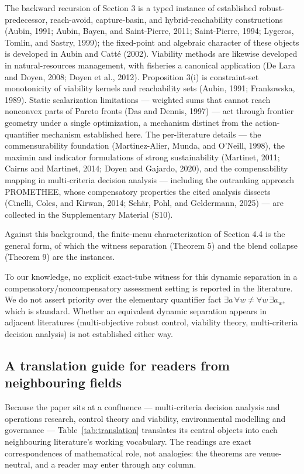 \documentclass[3p,11pt]{elsarticle}
\begin{document}
The backward recursion of Section 3 is
a typed instance of established robust-predecessor, reach-avoid,
capture-basin, and hybrid-reachability constructions (Aubin, 1991;
Aubin, Bayen, and Saint-Pierre, 2011; Saint-Pierre, 1994; Lygeros,
Tomlin, and Sastry, 1999); the fixed-point and algebraic character of these objects is developed in Aubin and Catt\'e (2002). Viability methods are likewise developed in natural-resources management, with fisheries a canonical application (De Lara and Doyen, 2008; Doyen et al., 2012). Proposition 3(i) is constraint-set
monotonicity of viability kernels and reachability sets (Aubin, 1991;
Frankowska, 1989). Static scalarization limitations --- weighted sums that cannot
reach nonconvex parts of Pareto fronts (Das and Dennis, 1997) --- act
through frontier geometry under a single optimization, a mechanism
distinct from the action-quantifier mechanism established here. The
per-literature details --- the commensurability foundation
(Martinez-Alier, Munda, and O'Neill, 1998), the maximin and indicator
formulations of strong sustainability (Martinet, 2011; Cairns and
Martinet, 2014; Doyen and Gajardo, 2020), and the compensability mapping
in multi-criteria decision analysis --- including the outranking approach
PROMETHEE, whose compensatory properties the cited analysis dissects
(Cinelli, Coles, and Kirwan, 2014; Sch\"ar, Pohl, and Geldermann, 2025) --- are collected in the
Supplementary Material (S10).

Against this background, the finite-menu characterization of
Section 4.4 is the general form, of which the witness separation
(Theorem 5) and the blend collapse (Theorem 9) are the instances.

To our knowledge, no explicit exact-tube witness for this dynamic
separation in a compensatory/noncompensatory assessment setting is
reported in the literature. We do not assert priority over the
elementary quantifier fact
\(\exists a\, \forall w \neq \forall w\, \exists a_w\), which is
standard. Whether an equivalent dynamic separation appears in adjacent
literatures (multi-objective robust control, viability theory,
multi-criteria decision analysis) is not established either way.

\subsection{A translation guide for readers from neighbouring
fields}\label{translation-guide}

Because the paper sits at a confluence --- multi-criteria decision analysis
and operations research, control theory and viability, environmental
modelling and governance --- Table~\ref{tab:translation} translates its
central objects into each neighbouring literature's working vocabulary. The
readings are exact correspondences of mathematical role, not analogies: the
theorems are venue-neutral, and a reader may enter through any column.
\end{document}
